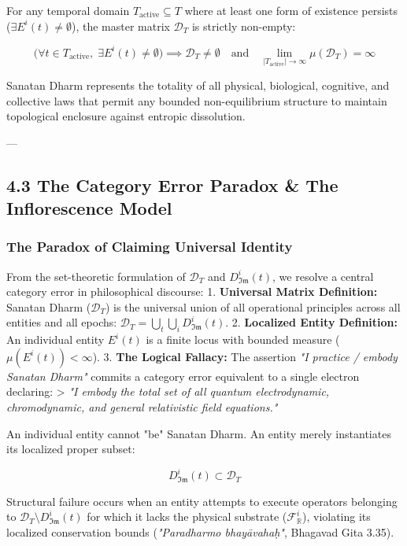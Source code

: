 \documentclass[11pt,a4paper]{article}
\theoremstyle{definition}
\theoremstyle{remark}
\begin{document}
For any temporal domain $T_{\text{active}} \subseteq T$ where at least one form of existence persists ($\exists E^i(t) \neq \emptyset$), the master matrix $\mathcal{D}_T$ is strictly non-empty:

\begin{equation}
\Big( \forall t \in T_{\text{active}}, \; \exists E^i(t) \neq \emptyset \Big) \implies \mathcal{D}_T \neq \emptyset \quad \text{and} \quad \lim_{|T_{\text{active}}| \to \infty} \mu(\mathcal{D}_T) = \infty
\end{equation}


Sanatan Dharm represents the totality of all physical, biological, cognitive, and collective laws that permit any bounded non-equilibrium structure to maintain topological enclosure against entropic dissolution.

---

\subsection{4.3 The Category Error Paradox \& The Inflorescence Model}

\subsubsection{The Paradox of Claiming Universal Identity}
From the set-theoretic formulation of $\mathcal{D}_T$ and $D_{\mathfrak{Im}}^i(t)$, we resolve a central category error in philosophical discourse:
1. \textbf{Universal Matrix Definition:} Sanatan Dharm ($\mathcal{D}_T$) is the universal union of all operational principles across all entities and all epochs: $\mathcal{D}_T = \bigcup_{t} \bigcup_{i} D_{\mathfrak{Im}}^i(t)$.
2. \textbf{Localized Entity Definition:} An individual entity $E^i(t)$ is a finite locus with bounded measure ($\mu(E^i(t)) < \infty$).
3. \textbf{The Logical Fallacy:} The assertion \textit{"I practice / embody Sanatan Dharm"} commits a category error equivalent to a single electron declaring:
   > \textit{"I embody the total set of all quantum electrodynamic, chromodynamic, and general relativistic field equations."}

An individual entity cannot "be" Sanatan Dharm. An entity merely instantiates its localized proper subset:

\begin{equation}
D_{\mathfrak{Im}}^i(t) \subset \mathcal{D}_T
\end{equation}


Structural failure occurs when an entity attempts to execute operators belonging to $\mathcal{D}_T \setminus D_{\mathfrak{Im}}^i(t)$ for which it lacks the physical substrate ($\mathcal{F}_{\mathbb{R}}^i$), violating its localized conservation bounds (\textit{"Paradharmo bhayāvahaḥ"}, Bhagavad Gita 3.35).
\end{document}
